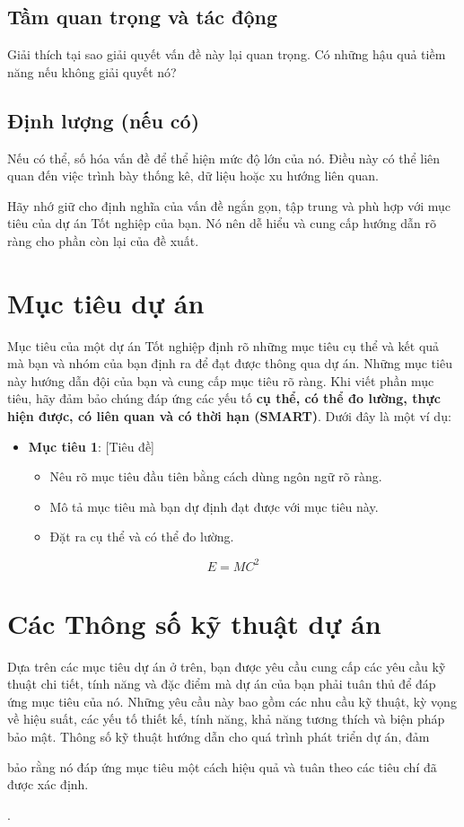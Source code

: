 \subsection{Tầm quan trọng và tác động}
Giải thích tại sao giải quyết vấn đề này lại quan trọng. Có những hậu quả tiềm năng nếu không giải quyết nó?

\subsection{Định lượng (nếu có)}
Nếu có thể, số hóa vấn đề để thể hiện mức độ lớn của nó. Điều này có thể liên quan đến việc trình bày thống kê, dữ liệu hoặc xu hướng liên quan.

Hãy nhớ giữ cho định nghĩa của vấn đề ngắn gọn, tập trung và phù hợp với mục tiêu của dự án Tốt nghiệp của bạn. Nó nên dễ hiểu và cung cấp hướng dẫn rõ ràng cho phần còn lại của đề xuất.

\section{Mục tiêu dự án}
Mục tiêu của một dự án Tốt nghiệp định rõ những mục tiêu cụ thể và kết quả mà bạn và nhóm của bạn định ra để đạt được thông qua dự án. Những mục tiêu này hướng dẫn đội của bạn và cung cấp mục tiêu rõ ràng. Khi viết phần mục tiêu, hãy đảm bảo chúng đáp ứng các yếu tố \textbf{cụ thể, có thể đo lường, thực hiện được, có liên quan và có thời hạn (SMART)}. Dưới đây là một ví dụ:

\begin{itemize}
\item \textbf{Mục tiêu 1}: [Tiêu đề]
      \begin{itemize}
        \item Nêu rõ mục tiêu đầu tiên bằng cách dùng ngôn ngữ rõ ràng.
        \item Mô tả mục tiêu mà bạn dự định đạt được với mục tiêu này.
        \item Đặt ra cụ thể và có thể đo lường.
      \end{itemize}
\end{itemize}

\begin{equation}
E = MC^2
\end{equation}

\section{Các Thông số kỹ thuật dự án}
Dựa trên các mục tiêu dự án ở trên, bạn được yêu cầu cung cấp các yêu cầu kỹ thuật chi tiết, tính năng và đặc điểm mà dự án của bạn phải tuân thủ để đáp ứng mục tiêu của nó. Những yêu cầu này bao gồm các nhu cầu kỹ thuật, kỳ vọng về hiệu suất, các yếu tố thiết kế, tính năng, khả năng tương thích và biện pháp bảo mật. Thông số kỹ thuật hướng dẫn cho quá trình phát triển dự án, đảm

 bảo rằng nó đáp ứng mục tiêu một cách hiệu quả và tuân theo các tiêu chí đã được xác định.

\cite{Tsebook05,SamarakoonTWC13,KeyInforcom2007}.